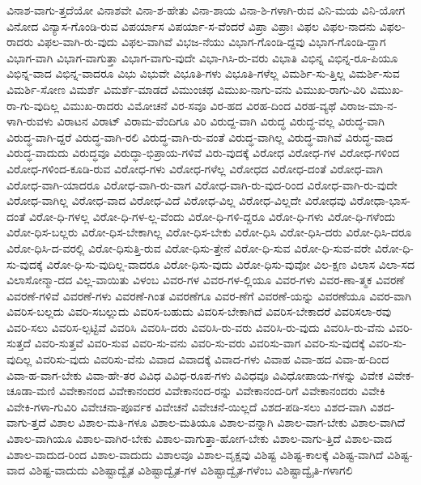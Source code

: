 {ವಿನಾಶ-ವಾಗು-ತ್ತದೆಯೋ
ವಿನಾಶವೇ
ವಿನಾ-ಶ-ಹೇತು
ವಿನಾ-ಶಾಯ
ವಿನಾ-ಶಿ-ಗಳಾಗಿ-ರುವ
ವಿನಿ-ಮಯ
ವಿನಿ-ಯೋಗ
ವಿನೋದ
ವಿನ್ಯಾಸ-ಗೊಂಡಿ-ರುವ
ವಿಪರ್ಯಾಸ
ವಿಪರ್ಯಾ-ಸ-ವೆಂದರೆ
ವಿಪ್ರಾ
ವಿಪ್ರಾಃ
ವಿಫಲ
ವಿಫಲ-ನಾದನು
ವಿಫಲ-ರಾದರು
ವಿಫಲ-ವಾಗಿ-ರು-ವುದು
ವಿಫಲ-ವಾಗಿವೆ
ವಿಭಜ-ನೆಯು
ವಿಭಾಗ-ಗೊಂಡಿ-ದ್ದವು
ವಿಭಾಗ-ಗೊಂಡಿ-ದ್ದಾಗ
ವಿಭಾಗ-ವಾಗಿ
ವಿಭಾಗ-ವಾಗುತ್ತಾ
ವಿಭಾಗ-ವಾಗು-ವುದೇ
ವಿಭಾ-ಗಿಸಿ-ರು-ವರು
ವಿಭಾತಿ
ವಿಭಿನ್ನ
ವಿಭಿನ್ನ-ರೂ-ಪಿಯೂ
ವಿಭಿನ್ನ-ವಾದ
ವಿಭಿನ್ನ-ವಾದರೂ
ವಿಭು
ವಿಭುವೇ
ವಿಭೂತಿ-ಗಳು
ವಿಭೂತಿ-ಗಳೆಲ್ಲ
ವಿಮರ್ಶಿ-ಸು-ತ್ತಿಲ್ಲ
ವಿಮರ್ಶಿ-ಸುವ
ವಿಮರ್ಶಿ-ಸೋಣ
ವಿಮರ್ಶೆ
ವಿಮರ್ಶೆ-ಮಾಡದೆ
ವಿಮುಂಚಥ
ವಿಮುಖ-ನಾಗು-ವನು
ವಿಮುಖ-ರಾಗು-ವಿರಿ
ವಿಮುಖ-ರಾ-ಗು-ವುದಿಲ್ಲ
ವಿಮುಖ-ರಾದರು
ವಿಮೋಚನೆ
ವಿರ-ಸವೂ
ವಿರ-ಹದ
ವಿರಹ-ದಿಂದ
ವಿರಹ-ವ್ಯಥೆ
ವಿರಾಜ-ಮಾ-ನ-ಳಾಗಿ-ರುವಳು
ವಿರಾಟನ
ವಿರಾಟ್
ವಿರಾಮ-ವೆಂದಿಗೂ
ವಿರಿ
ವಿರುದ್ದ-ವಾಗಿ
ವಿರುದ್ಧ
ವಿರುದ್ಧ-ವಲ್ಲ
ವಿರುದ್ಧ-ವಾಗಿ
ವಿರುದ್ಧ-ವಾಗಿ-ದ್ದರೆ
ವಿರುದ್ಧ-ವಾಗಿ-ರಲಿ
ವಿರುದ್ಧ-ವಾಗಿ-ರು-ವಂತೆ
ವಿರುದ್ಧ-ವಾಗಿಲ್ಲ
ವಿರುದ್ಧ-ವಾಗಿವೆ
ವಿರುದ್ಧ-ವಾದ
ವಿರುದ್ಧ-ವಾದುದು
ವಿರುದ್ಧವೂ
ವಿರುದ್ಧಾ-ಭಿಪ್ರಾಯ-ಗಳಿವೆ
ವಿರು-ವುದಕ್ಕೆ
ವಿರೋಧ
ವಿರೋಧ-ಗಳ
ವಿರೋಧ-ಗಳಿಂದ
ವಿರೋಧ-ಗಳಿಂದ-ಕೂಡಿ-ರುವ
ವಿರೋಧ-ಗಳು
ವಿರೋಧ-ಗಳೆಲ್ಲ
ವಿರೋಧದ
ವಿರೋಧ-ದಂತೆ
ವಿರೋಧ-ವಾಗಿ
ವಿರೋಧ-ವಾಗಿ-ಯಾದರೂ
ವಿರೋಧ-ವಾಗಿ-ರು-ವಾಗ
ವಿರೋಧ-ವಾಗಿ-ರು-ವುದ-ರಿಂದ
ವಿರೋಧ-ವಾಗಿ-ರು-ವುದೇ
ವಿರೋಧ-ವಾಗಿಲ್ಲ
ವಿರೋಧ-ವಾದ
ವಿರೋಧ-ವಿದೆ
ವಿರೋಧ-ವಿಲ್ಲ
ವಿರೋಧ-ವಿಲ್ಲದೇ
ವಿರೋಧವು
ವಿರೋಧಾ-ಭಾಸ-ದಂತೆ
ವಿರೋ-ಧಿ-ಗಳಲ್ಲ
ವಿರೋ-ಧಿ-ಗಳ-ಲ್ಲ-ವೆಂದು
ವಿರೋ-ಧಿ-ಗಳಿ-ದ್ದರೂ
ವಿರೋ-ಧಿ-ಗಳು
ವಿರೋ-ಧಿ-ಗಳೆಂದು
ವಿರೋ-ಧಿಸ-ಬಲ್ಲರು
ವಿರೋ-ಧಿಸ-ಬೇಕಾಗಿಲ್ಲ
ವಿರೋ-ಧಿಸ-ಬೇಕು
ವಿರೋ-ಧಿಸಿ
ವಿರೋ-ಧಿಸಿ-ದರು
ವಿರೋ-ಧಿಸಿ-ದರೂ
ವಿರೋ-ಧಿಸಿ-ದ-ವರಲ್ಲಿ
ವಿರೋ-ಧಿಸುತ್ತಿ-ರುವ
ವಿರೋ-ಧಿಸು-ತ್ತೇನೆ
ವಿರೋ-ಧಿ-ಸುವ
ವಿರೋ-ಧಿ-ಸುವ-ವರೇ
ವಿರೋ-ಧಿ-ಸು-ವುದಕ್ಕೆ
ವಿರೋ-ಧಿ-ಸು-ವುದಿಲ್ಲ-ವಾದರೂ
ವಿರೋ-ಧಿಸು-ವುದು
ವಿರೋ-ಧಿಸು-ವುವೋ
ವಿಲ-ಕ್ಷಣ
ವಿಲಾಸ
ವಿಲಾ-ಸದ
ವಿಲಾಸೋನ್ಮಾ-ದದ
ವಿಲ್ಲ-ವಾಯಿತು
ವಿಳಂಬ
ವಿವರ-ಗಳ
ವಿವರ-ಗಳ-ಲ್ಲಿಯೂ
ವಿವರ-ಗಳು
ವಿವರ-ಣಾ-ತ್ಮಕ
ವಿವರಣೆ
ವಿವರಣೆ-ಗಳಿವೆ
ವಿವರಣೆ-ಗಳು
ವಿವರಣೆ-ಗಿಂತ
ವಿವರಣೆಗೂ
ವಿವರ-ಣೆಗೆ
ವಿವರಣೆ-ಯನ್ನು
ವಿವರಣೆಯೂ
ವಿವರ-ವಾಗಿ
ವಿವರಿಸ-ಬಲ್ಲದು
ವಿವರಿ-ಸಬಲ್ಲುದು
ವಿವರಿಸ-ಬಹುದು
ವಿವರಿಸ-ಬೇಕಾಗಿದೆ
ವಿವರಿಸ-ಬೇಕಾದರೆ
ವಿವರಿಸಲಾ-ರವು
ವಿವರಿ-ಸಲು
ವಿವರಿಸ-ಲ್ಪಟ್ಟಿವೆ
ವಿವರಿಸಿ
ವಿವರಿಸಿ-ದರು
ವಿವರಿಸಿ-ರು-ವರು
ವಿವರಿಸಿ-ರು-ವುದು
ವಿವರಿಸಿ-ರು-ವೆನು
ವಿವರಿ-ಸುತ್ತದೆ
ವಿವರಿ-ಸುತ್ತವೆ
ವಿವರಿ-ಸುವ
ವಿವರಿ-ಸು-ವನು
ವಿವರಿ-ಸು-ವರು
ವಿವರಿಸು-ವಾಗ
ವಿವರಿ-ಸು-ವುದಕ್ಕೆ
ವಿವರಿ-ಸು-ವುದಿಲ್ಲ
ವಿವರಿಸು-ವುದು
ವಿವರಿಸು-ವೆನು
ವಿವಾದ
ವಿವಾದಕ್ಕೆ
ವಿವಾದ-ಗಳು
ವಿವಾಹ
ವಿವಾ-ಹದ
ವಿವಾ-ಹ-ದಿಂದ
ವಿವಾ-ಹ-ವಾಗ-ಬೇಕು
ವಿವಾ-ಹೇ-ತರ
ವಿವಿಧ
ವಿವಿಧ-ರೂಪ-ಗಳು
ವಿವಿಧವೂ
ವಿವಿಧೋಪಾಯ-ಗಳನ್ನು
ವಿವೇಕ
ವಿವೇಕ-ಚೂಡಾ-ಮಣಿ
ವಿವೇಕಾನಂದ
ವಿವೇಕಾನಂದರ
ವಿವೇಕಾನಂದ-ರನ್ನು
ವಿವೇಕಾನಂದ-ರಿಗೆ
ವಿವೇಕಾನಂದರು
ವಿವೇಕಿ
ವಿವೇಕಿ-ಗಳಾ-ಗುವಿರಿ
ವಿವೇಚನಾ-ಪೂರ್ವಕ
ವಿವೇಚನೆ
ವಿವೇಚನೆ-ಯಿಲ್ಲದೆ
ವಿಶದ-ಪಡಿ-ಸಲು
ವಿಶದ-ವಾಗಿ
ವಿಶದ-ವಾಗು-ತ್ತದೆ
ವಿಶಾಲ
ವಿಶಾಲ-ಮತಿ-ಗಳೂ
ವಿಶಾಲ-ಮತಿಯೂ
ವಿಶಾಲ-ವನ್ನಾಗಿ
ವಿಶಾಲ-ವಾಗ-ಬೇಕು
ವಿಶಾಲ-ವಾಗಿದೆ
ವಿಶಾಲ-ವಾಗಿಯೂ
ವಿಶಾಲ-ವಾಗಿರ-ಬೇಕು
ವಿಶಾಲ-ವಾಗುತ್ತಾ-ಹೋಗ-ಬೇಕು
ವಿಶಾಲ-ವಾಗು-ತ್ತಿದೆ
ವಿಶಾಲ-ವಾದ
ವಿಶಾಲ-ವಾದುದ-ರಿಂದ
ವಿಶಾಲ-ವಾದುದು
ವಿಶಾಲವೂ
ವಿಶಾಲ-ವೃಕ್ಷವು
ವಿಶಿಷ್ಟ
ವಿಶಿಷ್ಟ-ಕಾಲಕ್ಕೆ
ವಿಶಿಷ್ಟ-ವಾಗಿದೆ
ವಿಶಿಷ್ಟ-ವಾದ
ವಿಶಿಷ್ಟ-ವಾದುದು
ವಿಶಿಷ್ಟಾದ್ವೈತ
ವಿಶಿಷ್ಟಾದ್ವೈತ-ಗಳ
ವಿಶಿಷ್ಟಾದ್ವೈತ-ಗಳೆಂಬ
ವಿಶಿಷ್ಟಾದ್ವೈತಿ-ಗಳಾಗಲಿ
}
